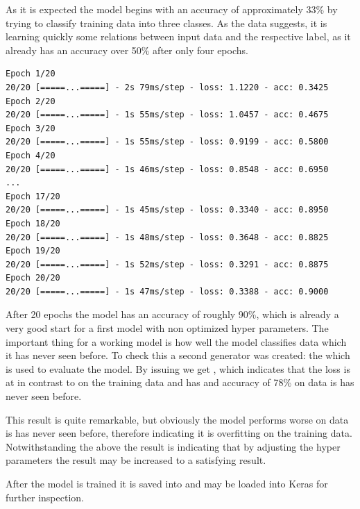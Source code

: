 As it is expected the model begins with an accuracy of approximately 33\% by trying to classify training data into three classes.
As the data suggests, it is learning quickly some relations between input data and the respective label, as it already has an accuracy over 50\% after only four epochs.

\begin{lstlisting}
Epoch 1/20
20/20 [=====...=====] - 2s 79ms/step - loss: 1.1220 - acc: 0.3425
Epoch 2/20
20/20 [=====...=====] - 1s 55ms/step - loss: 1.0457 - acc: 0.4675
Epoch 3/20
20/20 [=====...=====] - 1s 55ms/step - loss: 0.9199 - acc: 0.5800
Epoch 4/20
20/20 [=====...=====] - 1s 46ms/step - loss: 0.8548 - acc: 0.6950
...
Epoch 17/20
20/20 [=====...=====] - 1s 45ms/step - loss: 0.3340 - acc: 0.8950
Epoch 18/20
20/20 [=====...=====] - 1s 48ms/step - loss: 0.3648 - acc: 0.8825
Epoch 19/20
20/20 [=====...=====] - 1s 52ms/step - loss: 0.3291 - acc: 0.8875
Epoch 20/20
20/20 [=====...=====] - 1s 47ms/step - loss: 0.3388 - acc: 0.9000
\end{lstlisting}

After 20 epochs the model has an accuracy of roughly 90\%, which is already a very good start for a first model with non optimized hyper parameters.
The important thing for a working model is how well the model classifies data which it has never seen before.
To check this a second generator was created: the  which is used to evaluate the model.
By issuing  we get \code{[0.6071663084129493, 0.7866667]}, which indicates that the loss is at  in contrast to  on the training data and has and accuracy of 78\% on data is has never seen before.

This result is quite remarkable, but obviously the model performs worse on data is has never seen before, therefore indicating it is overfitting on the training data.
Notwithstanding the above the result is indicating that by adjusting the hyper parameters the result may be increased to a satisfying result.

After the model is trained it is saved into  and may be loaded into Keras for further inspection.